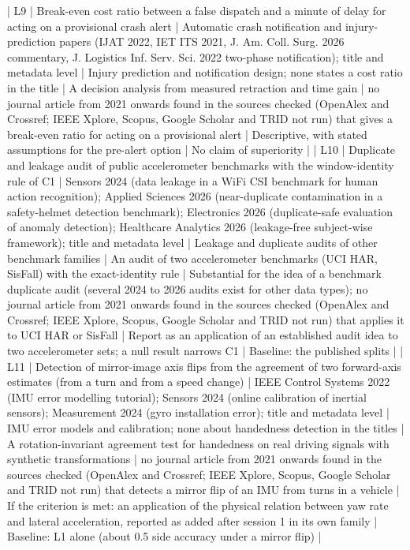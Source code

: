 | L9 | Break-even cost ratio between a false dispatch and a minute of delay for acting on a provisional crash alert | Automatic crash notification and injury-prediction papers (IJAT 2022, IET ITS 2021, J. Am. Coll. Surg. 2026 commentary, J. Logistics Inf. Serv. Sci. 2022 two-phase notification); title and metadata level | Injury prediction and notification design; none states a cost ratio in the title | A decision analysis from measured retraction and time gain | no journal article from 2021 onwards found in the sources checked (OpenAlex and Crossref; IEEE Xplore, Scopus, Google Scholar and TRID not run) that gives a break-even ratio for acting on a provisional alert | Descriptive, with stated assumptions for the pre-alert option | No claim of superiority |
| L10 | Duplicate and leakage audit of public accelerometer benchmarks with the window-identity rule of C1 | Sensors 2024 (data leakage in a WiFi CSI benchmark for human action recognition); Applied Sciences 2026 (near-duplicate contamination in a safety-helmet detection benchmark); Electronics 2026 (duplicate-safe evaluation of anomaly detection); Healthcare Analytics 2026 (leakage-free subject-wise framework); title and metadata level | Leakage and duplicate audits of other benchmark families | An audit of two accelerometer benchmarks (UCI HAR, SisFall) with the exact-identity rule | Substantial for the idea of a benchmark duplicate audit (several 2024 to 2026 audits exist for other data types); no journal article from 2021 onwards found in the sources checked (OpenAlex and Crossref; IEEE Xplore, Scopus, Google Scholar and TRID not run) that applies it to UCI HAR or SisFall | Report as an application of an established audit idea to two accelerometer sets; a null result narrows C1 | Baseline: the published splits |
| L11 | Detection of mirror-image axis flips from the agreement of two forward-axis estimates (from a turn and from a speed change) | IEEE Control Systems 2022 (IMU error modelling tutorial); Sensors 2024 (online calibration of inertial sensors); Measurement 2024 (gyro installation error); title and metadata level | IMU error models and calibration; none about handedness detection in the titles | A rotation-invariant agreement test for handedness on real driving signals with synthetic transformations | no journal article from 2021 onwards found in the sources checked (OpenAlex and Crossref; IEEE Xplore, Scopus, Google Scholar and TRID not run) that detects a mirror flip of an IMU from turns in a vehicle | If the criterion is met: an application of the physical relation between yaw rate and lateral acceleration, reported as added after session 1 in its own family | Baseline: L1 alone (about 0.5 side accuracy under a mirror flip) |



